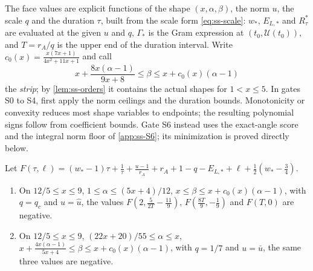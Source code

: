 The face values are explicit functions of the shape $(x,\alpha,\beta)$, the norm $u$, the scale
$q$ and the duration $\tau$, built from the scale form \eqref{eq:ss-scale}: $w_*$, $E_{L,*}$ and
$R^*_\tau$ are evaluated at the given $u$ and $q$, $\Gamma_*$ is the Gram expression at
$(t_0,\mathcal U(t_0))$, and $T=r_A/q$ is the upper end of the duration interval. Write
$c_0(x)=\frac{x(7x+1)}{4x^2+11x+1}$ and call
\[
  x+\frac{8x(\alpha-1)}{9x+8}\le\beta\le x+c_0(x)(\alpha-1)
\]
the \emph{strip}; by \cref{lem:ss-orders} it contains the actual shapes for $1<x\le5$. In
gates S0 to S4, first apply the norm ceilings and the duration bounds.
Monotonicity or convexity reduces most shape variables to endpoints; the resulting polynomial
signs follow from coefficient bounds. Gate S6 instead uses the exact-angle score and the integral norm floor of
\cref{app:ss-S6}; its minimization is proved directly below.

\begin{proposition}\label{prop:ss-face-S0}
Let $F(\tau,\ell)=(w_*-1)\tau+\frac1\tau+\frac{u-1}{r_A}+r_A+1-q-E_{L,*}+\ell+\frac12(w_*-\frac34)$.
\begin{enumerate}[label=(\alph*)]
\item On $12/5\le x\le9$, $1\le\alpha\le(5x+4)/12$, $x\le\beta\le x+c_0(x)(\alpha-1)$, with $q=q_c$
  and $u=\hat u$, the values $F(2,\frac5{2T}-\frac{11}9)$, $F(\frac{8T}9,-\frac19)$ and $F(T,0)$
  are negative.
\item On $12/5\le x\le9$, $(22x+20)/55\le\alpha\le x$,
  $x+\frac{4x(\alpha-1)}{5x+4}\le\beta\le x+c_0(x)(\alpha-1)$, with $q=1/7$ and $u=\bar u$, the
  same three values are negative.
\end{enumerate}
\end{proposition}

